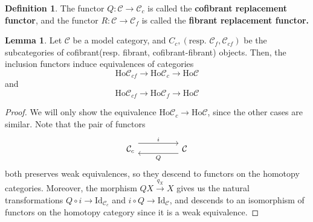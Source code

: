 \documentclass{article}
\theoremstyle{definition}
\theoremstyle{definition}
\newtheorem{definition}{Definition}[theorem]
\theoremstyle{definition}
\theoremstyle{definition}
\theoremstyle{definition}
\newtheorem{lemma}[theorem]{Lemma}
\theoremstyle{definition}
\theoremstyle{definition}
\begin{document}
\begin{definition}
	The functor $Q: \mathcal{C}\to \mathcal{C}_c$ is called the \textbf{cofibrant replacement functor}, and the functor $R: \mathcal{C}\to \mathcal{C}_f$ is called the \textbf{fibrant replacement functor.}
\end{definition}

\begin{lemma}
	Let $\mathcal{C}$ be a model category, and $C_{c},(\textrm{resp. } \mathcal{C}_f,\mathcal{C}_{cf})$ be the subcategories of cofibrant(resp. fibrant, cofibrant-fibrant) objects. Then, the inclusion functors induce equivalences of categories 
	\[\textrm{Ho}\mathcal{C}_{cf}\to \textrm{Ho}\mathcal{C}_{c}\to \textrm{Ho}\mathcal{C}\]
	and 
	\[\textrm{Ho}\mathcal{C}_{cf}\to \textrm{Ho}\mathcal{C}_{f}\to \textrm{Ho}\mathcal{C}\]
	
\end{lemma}
\begin{proof}
	We will only show the equivalence $\textrm{Ho}\mathcal{C}_c\to \textrm{Ho} \mathcal{C}$, since the other cases are similar. Note that the pair of functors 
	\[\begin{tikzcd}
		{\mathcal{C}_c} && \mathcal{C}
		\arrow["i", shift left=3, from=1-1, to=1-3]
		\arrow["Q", shift left=2, from=1-3, to=1-1]
	\end{tikzcd}\]
	both preserves weak equivalences, so they descend to functors on the homotopy categories. Moreover, the morphism $QX\xrightarrow{q_X} X$ gives us the natural transformations
	$Q\circ i\to \textrm{Id}_{\mathcal{C}_c}$ and $i\circ Q\to \textrm{Id}_{\mathcal{C}}$, and descends to an isomorphism of functors on the homotopy category since it is a weak equivalence. 
\end{proof}
\end{document}
